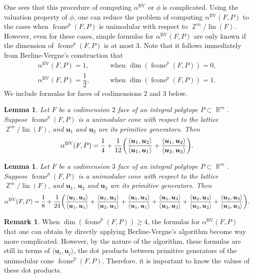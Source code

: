 \documentclass[12pt]{amsart}
\numberwithin{equation}{section}
\newtheorem{lem}[thm]{Lemma}
\theoremstyle{definition}
\newtheorem{rmk}[thm]{Remark}
\def\fcone{\operatorname{fcone}}
\def\lin{\operatorname{lin}}
\def\bu{\boldsymbol{u}}
\def\bvalpha{\operatorname{\alpha^{BV}}}
\def\Z{\operatorname{\mathbb{Z}}}
\def\R{\operatorname{\mathbb{R}}}
\begin{document}
One sees that this procedure of computing $\bvalpha$ or $\phi$ is complicated. 
Using the valuation property of $\phi$, one can reduce the problem of computing $\bvalpha(F, P)$ to the cases when  $\fcone^{p}(F,P)$ is unimodular with respect to $\Z^m/\lin(F)$. 
However, even for these cases, simple formulas for $\bvalpha(F,P)$ are only known if the dimension of $\fcone^{p}(F,P)$ is at most $3$. Note that it \cite[Example 19.2]{barvinok2008integer} follows immediately from Berline-Vergne's construction that 
\begin{eqnarray*}
	\bvalpha(F,P)=1, & \quad& \text{ when } \dim(\fcone^{p}(F,P))=0, \\
	\bvalpha(F,P)=\dfrac{1}{2}, & \quad& \text{ when } \dim(\fcone^{p}(F,P))=1.
\end{eqnarray*}
We include formulas for faces of codimensions $2$ and $3$ below.
\begin{lem} \cite[Example 19.3]{barvinok2008integer} \label{cd2} 
Let $F$ be a codimension $2$ face of an integral polytope $P \subset \R^m$. Suppose $\fcone^{p}(F,P)$ is a unimodular cone with respect to the lattice $\Z^{m}/\lin(F)$, and $\bu_1$ and $\bu_2$ are its primitive generators. 
Then 
    \[\bvalpha(F,P)=\frac{1}{4}+\frac{1}{12}\biggl{(}\frac{\left \langle \bu_1,\bu_2\right \rangle}{\left \langle \bu_1,\bu_1\right \rangle}+\frac{\left \langle \bu_1,\bu_2\right \rangle}{\left \langle \bu_2,\bu_2\right \rangle}\biggl{)}.\]
\end{lem}

\begin{lem} \cite[Lemma 3.10]{castillo2018berline} \label{cd3} 
  Let $F$ be a codimension $3$ face of an integral polytope $P \subset \R^m$. Suppose $\fcone^{p}(F,P)$ is a unimodular cone with respect to the lattice $\Z^{m}/\lin(F)$, and $\bu_1$, $\bu_2$ and $\bu_3$ are its primitive generators. Then
    \[\bvalpha(F,P)=\frac{1}{8}+\frac{1}{24}\biggl{(}\frac{\left \langle \bu_1,\bu_2\right \rangle}{\left \langle \bu_1,\bu_1\right \rangle}+\frac{\left \langle \bu_1,\bu_2\right \rangle}{\left \langle \bu_2,\bu_2\right \rangle}+\frac{\left \langle \bu_1,\bu_3\right \rangle}{\left \langle \bu_1,\bu_1\right \rangle}+\frac{\left \langle \bu_1,\bu_3\right \rangle}{\left \langle \bu_3,\bu_3\right \rangle}+\frac{\left \langle \bu_2,\bu_3\right \rangle}{\left \langle \bu_2,\bu_2\right \rangle}+\frac{\left \langle \bu_2,\bu_3\right \rangle}{\left \langle \bu_3,\bu_3\right \rangle}\biggl{)}.\]
\end{lem}

\begin{rmk} \label{alpharmk}
	When $\dim(\fcone^{p}(F,P)) \geq 4$, the formulas for $\bvalpha(F,P)$ that one can obtain by directly applying Berline-Vergne's algorithm become way more complicated. However, by the nature of the algorithm, these formulas are still in terms of $\langle \bu_{i}, \bu_{j} \rangle$, the dot products between primitive generators of the unimodular cone $\fcone^p(F,P).$ Therefore, it is important to know the values of these dot products. 
\end{rmk}
\end{document}
